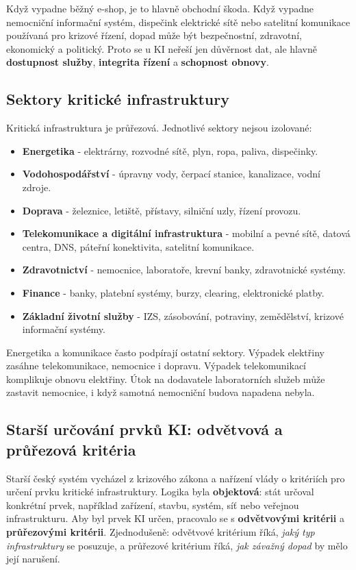 \documentclass[11pt,a4paper]{article}
\begin{document}
Když vypadne běžný e-shop, je to hlavně obchodní škoda. Když vypadne nemocniční informační systém, dispečink elektrické sítě nebo satelitní komunikace používaná pro krizové řízení, dopad může být bezpečnostní, zdravotní, ekonomický a politický. Proto se u KI neřeší jen důvěrnost dat, ale hlavně \textbf{dostupnost služby}, \textbf{integrita řízení} a \textbf{schopnost obnovy}.

\subsection*{Sektory kritické infrastruktury}
Kritická infrastruktura je průřezová. Jednotlivé sektory nejsou izolované:
\begin{itemize}
  \item \textbf{Energetika} - elektrárny, rozvodné sítě, plyn, ropa, paliva, dispečinky.
  \item \textbf{Vodohospodářství} - úpravny vody, čerpací stanice, kanalizace, vodní zdroje.
  \item \textbf{Doprava} - železnice, letiště, přístavy, silniční uzly, řízení provozu.
  \item \textbf{Telekomunikace a digitální infrastruktura} - mobilní a pevné sítě, datová centra, DNS, páteřní konektivita, satelitní komunikace.
  \item \textbf{Zdravotnictví} - nemocnice, laboratoře, krevní banky, zdravotnické systémy.
  \item \textbf{Finance} - banky, platební systémy, burzy, clearing, elektronické platby.
  \item \textbf{Základní životní služby} - IZS, zásobování, potraviny, zemědělství, krizové informační systémy.
\end{itemize}
Energetika a komunikace často podpírají ostatní sektory. Výpadek elektřiny zasáhne telekomunikace, nemocnice i dopravu. Výpadek telekomunikací komplikuje obnovu elektřiny. Útok na dodavatele laboratorních služeb může zastavit nemocnice, i když samotná nemocniční budova napadena nebyla.

\subsection*{Starší určování prvků KI: odvětvová a průřezová kritéria}
Starší český systém vycházel z krizového zákona a nařízení vlády o kritériích pro určení prvku kritické infrastruktury. Logika byla \textbf{objektová}: stát určoval konkrétní prvek, například zařízení, stavbu, systém, síť nebo veřejnou infrastrukturu. Aby byl prvek KI určen, pracovalo se s \textbf{odvětvovými kritérii} a \textbf{průřezovými kritérii}. Zjednodušeně: odvětvové kritérium říká, \emph{jaký typ infrastruktury} se posuzuje, a průřezové kritérium říká, \emph{jak závažný dopad} by mělo její narušení.
\end{document}
